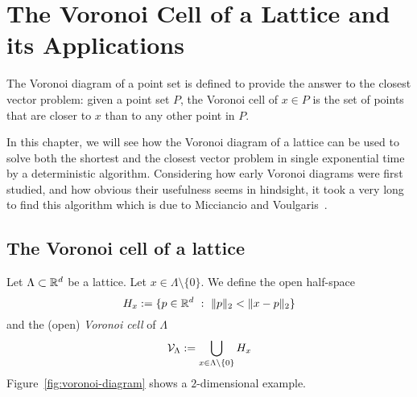 %
%
%

\chapter{The Voronoi Cell of a Lattice and its Applications}

The Voronoi diagram of a point set is defined
to provide the answer to the closest vector problem:
given a point set $P$,
the Voronoi cell of $x \in P$ is the set of points
that are closer to $x$ than to any other point in $P$.

In this chapter, we will see how the Voronoi diagram of a lattice
can be used to solve both the shortest and the closest vector problem
in single exponential time by a deterministic algorithm.
Considering how early Voronoi diagrams were first studied,
and how obvious their usefulness seems in hindsight,
it took a very long to find this algorithm
which is due to Micciancio and Voulgaris~\cite{MR2743283}.


\section{The Voronoi cell of a lattice}

\begin{definition}
  Let $\Lambda \subset \mathbb{R}^d$ be a lattice.
  Let $x \in \Lambda \setminus \{ 0 \}$.
  We define the open half-space
  \[
    H_x := \{ p \in \mathbb{R}^d ~:~ \|p\|_2 < \|x-p\|_2 \}
  \]
  and the (open) \emph{Voronoi cell} of $\Lambda$
  \[
    \mathcal{V}_\Lambda := \bigcup_{x \in \Lambda\setminus\{0\}} H_x
  \]
  Figure~\ref{fig:voronoi-diagram} shows a $2$-dimensional example.
\end{definition}


